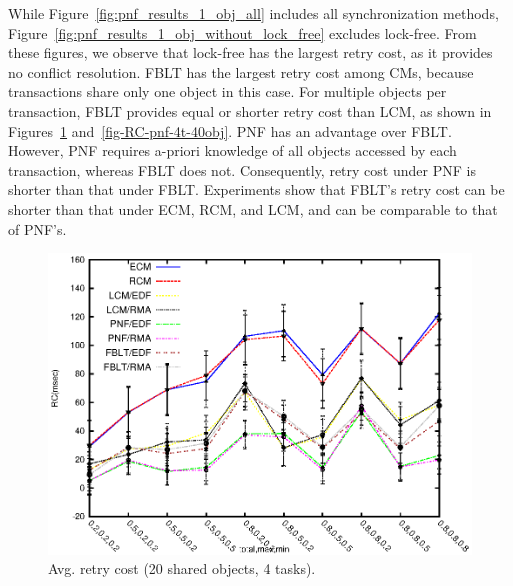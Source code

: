 \documentclass[prodmode,acmtecs]{acmsmall}
\begin{document}
\begin{compactenum}
While Figure~\ref{fig:pnf_results_1_obj_all} includes all synchronization methods, Figure~\ref{fig:pnf_results_1_obj_without_lock_free} excludes lock-free. From these figures, we observe that lock-free has the largest retry cost, as it provides no conflict resolution. FBLT has the largest retry cost among CMs,  because transactions share only one object in this case. For multiple objects per transaction, FBLT provides equal or shorter retry cost than LCM, as shown in Figures~\ref{fig-RC-pnf-4t-20obj} and~\ref{fig-RC-pnf-4t-40obj}. PNF has an advantage over FBLT. However, PNF requires a-priori knowledge of all objects accessed by each transaction, whereas FBLT does not. Consequently, retry cost under PNF is shorter than that under FBLT. Experiments show that FBLT's retry cost can be shorter than that under ECM, RCM, and LCM, and can be comparable to that of PNF's.

\begin{figure}
\centering
\includegraphics[scale=0.8]{figures/Abr_dur_4t_50obj_100wr_-1eta}
\caption{Avg. retry cost (20 shared objects, 4 tasks).}
\label{fig-RC-pnf-4t-20obj}
\end{figure}


\end{compactenum}
\end{document}
